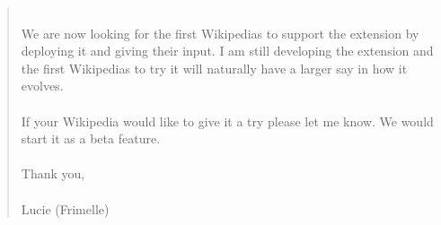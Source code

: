 \begin{quote}
\\
We are now looking for the first Wikipedias to support the extension by deploying it and giving their input. I am still developing the extension and the first Wikipedias to try it will naturally have a larger say in how it evolves. \\
\\
If your Wikipedia would like to give it a try please let me know. We would start it as a beta feature. \\
\\
Thank you, \\
\\
Lucie (Frimelle)
\end{quote}
\citep{kaffee:01} 








